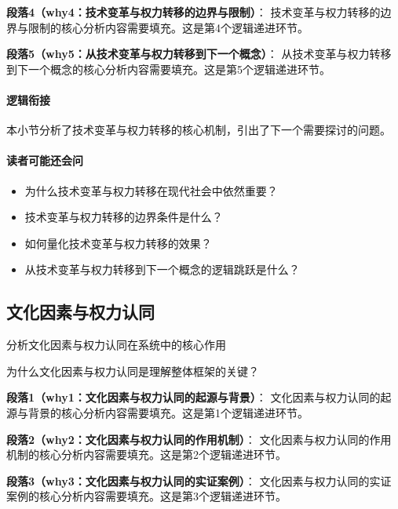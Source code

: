 \documentclass[../main.tex]{subfiles}
\begin{document}
\textbf{段落4（why4：技术变革与权力转移的边界与限制）}：
技术变革与权力转移的边界与限制的核心分析内容需要填充。这是第4个逻辑递进环节。


\textbf{段落5（why5：从技术变革与权力转移到下一个概念）}：
从技术变革与权力转移到下一个概念的核心分析内容需要填充。这是第5个逻辑递进环节。


\paragraph*{逻辑衔接}
本小节分析了技术变革与权力转移的核心机制，引出了下一个需要探讨的问题。

\paragraph*{读者可能还会问}
\begin{itemize}
\item 为什么技术变革与权力转移在现代社会中依然重要？
\item 技术变革与权力转移的边界条件是什么？
\item 如何量化技术变革与权力转移的效果？
\item 从技术变革与权力转移到下一个概念的逻辑跳跃是什么？
\end{itemize}


\subsection{文化因素与权力认同}

\begin{motivation}
分析文化因素与权力认同在系统中的核心作用
\end{motivation}

\begin{logicmap}
[逻辑链占位]
\end{logicmap}

\begin{questionbox}
为什么文化因素与权力认同是理解整体框架的关键？
\end{questionbox}

\textbf{段落1（why1：文化因素与权力认同的起源与背景）}：
文化因素与权力认同的起源与背景的核心分析内容需要填充。这是第1个逻辑递进环节。


\textbf{段落2（why2：文化因素与权力认同的作用机制）}：
文化因素与权力认同的作用机制的核心分析内容需要填充。这是第2个逻辑递进环节。


\textbf{段落3（why3：文化因素与权力认同的实证案例）}：
文化因素与权力认同的实证案例的核心分析内容需要填充。这是第3个逻辑递进环节。
\end{document}
